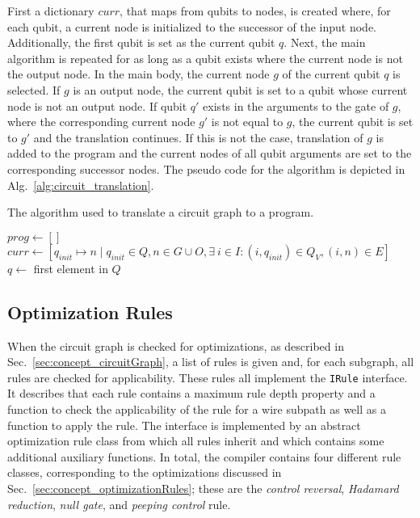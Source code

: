 First a dictionary $curr$, that maps from qubits to nodes, is created where, for each qubit, a current node is initialized to the successor of the input node. Additionally, the first qubit is set as the current qubit $q$. Next, the main algorithm is repeated for as long as a qubit exists where the current node is not the output node. In the main body, the current node $g$ of the current qubit $q$ is selected. If $g$ is an output node, the current qubit is set to a qubit whose current node is not an output node. If qubit $q'$ exists in the arguments to the gate of $g$, where the corresponding current node $g'$ is not equal to $g$, the current qubit is set to $g'$ and the translation continues. If this is not the case, translation of $g$ is added to the program and the current nodes of all qubit arguments are set to the corresponding successor nodes. The pseudo code for the algorithm is depicted in Alg.~\ref{alg:circuit_translation}.

\begin{algorithm}
    \caption{The algorithm used to translate a circuit graph to a program.}
    \label{alg:circuit_translation}
    $prog \gets []$\;
    $curr \gets [q_{init} \mapsto n \mid q_{init} \in Q, n \in G \cup O, \exists \ i \in I : (i, q_{init}) \in Q_V, (i, n) \in E]$\;
    $q \gets$ first element in $Q$\; 
\end{algorithm}

\subsection{Optimization Rules}
When the circuit graph is checked for optimizations, as described in Sec.~\ref{sec:concept_circuitGraph}, a list of rules is given and, for each subgraph, all rules are checked for applicability. These rules all implement the \texttt{IRule} interface. It describes that each rule contains a maximum rule depth property and a function to check the applicability of the rule for a wire subpath as well as a function to apply the rule. The interface is implemented by an abstract optimization rule class from which all rules inherit and which contains some additional auxiliary functions. In total, the compiler contains four different rule classes, corresponding to the optimizations discussed in Sec.~\ref{sec:concept_optimizationRules}; these are the \emph{control reversal}, \emph{Hadamard reduction}, \emph{null gate}, and \emph{peeping control} rule. 

